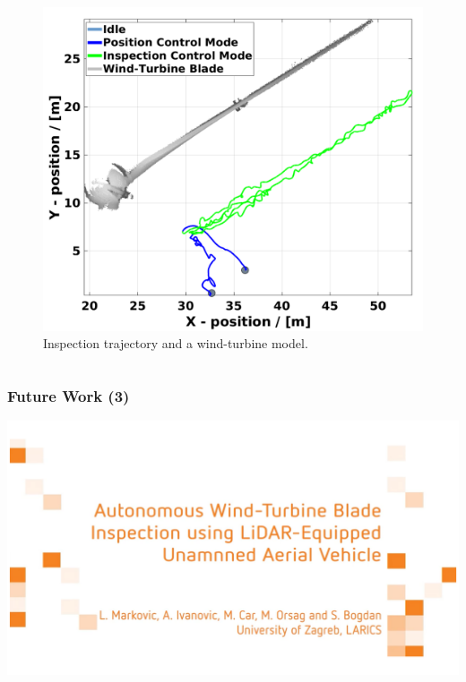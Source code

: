 \begin{frame}
\begin{columns}
		\begin{column}{0.5\textwidth}\centering
			\begin{figure}[H]
				\centering
				\includegraphics[width=0.9\columnwidth]{figures/uav_position_experiment_resized.pdf}
				\caption{Inspection trajectory and a wind-turbine model.}
			\end{figure}
		\end{column}
	\end{columns}
\end{frame}

\begin{frame}
	\frametitle{Future Work (3)}
	\href{video_presentation.mp4}{\includegraphics[width=\textwidth]{figures/title_screen.png}}
\end{frame}
